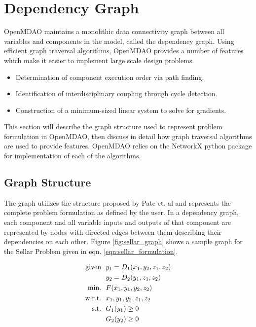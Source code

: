 \documentclass[]{aiaa-tc} %
\newcommand{\txt}{\textrm}
\begin{document}
  \section{Dependency Graph}

    OpenMDAO maintains a monolithic data connectivity graph between all
    variables and components in the model, called the dependency graph.
    Using efficient graph traversal algorithms, OpenMDAO provides a number of
    features which make it easier to implement large scale design problems.

    \begin{itemize}
      \item Determination of component execution order via path finding.
      \item Identification of interdisciplinary coupling through cycle detection.
      \item Construction of a minimum-sized linear system to solve for gradients.
    \end{itemize}

    This section will describe the graph structure used to represent problem formulation in OpenMDAO,
    then discuss in detail how graph traversal algorithms are used to provide features. OpenMDAO relies
    on the NetworkX \cite{hagberg-2008-exploring} python package for implementation of each of
    the algorithms.

    \subsection{Graph Structure}
    The graph utilizes the structure proposed by
    Pate et. al \cite{graph_problem2013} and represents the complete problem formulation as
    defined by the user. In a dependency graph, each component and all variable inputs and outputs of that component are
    represented by nodes with directed edges between them describing their dependencies on each other.
    Figure \ref{fig:sellar_graph} shows a sample graph for the Sellar Problem \cite{AIAA:sellar}
    given in eqn. \ref{eqn:sellar_formulation}.


    \begin{align}
        \txt{given} & \ \ y_1 = D_1(x_1,y_2,z_1,z_2) \notag
        \\      & \ \ y_2 = D_2(y_1,z_1,z_2) \notag
        \\\txt{min.} &\ \ F(x_1,y_1,y_2,z_2) \notag
        \\\txt{w.r.t.} & \ \ x_1,y_1,y_2,z_1,z_2 \notag
        \\\txt{s.t.} & \ \ G_1(y_1) \geq 0 \notag
        \\     & \ \ G_2(y_2) \geq 0
        \label{eqn:sellar_formulation}
    \end{align}
\end{document}
